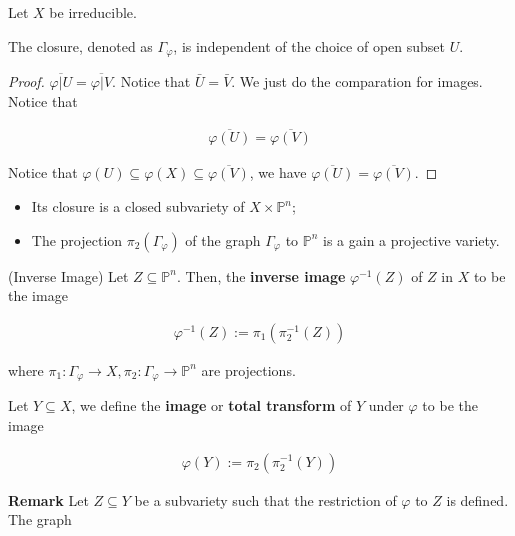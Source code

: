 \documentclass[Total.tex]{subfiles}
\begin{document}
		\begin{proposition}
			Let $X$ be irreducible.
			
			The closure, denoted as $\Gamma_\varphi$, is independent of the choice of open subset $U$.
		\end{proposition}
		
		\begin{proof}
			$\overline{\varphi|U}=\overline{\varphi|V}$. Notice that $\bar{U}=\bar{V}$. We just do the comparation for images. Notice that
			
			\begin{gather*}
				\overline{\varphi(U)}=\overline{\varphi(V)}
			\end{gather*}
			
			Notice that $\varphi(U)\subseteq \varphi(X)\subseteq \overline{\varphi(V)}$, we have $\overline{\varphi(U)}=\overline{\varphi(V)}$.
		\end{proof}
		
		\begin{itemize}
			\item Its closure is a closed subvariety of $X\times \mathbb{P}^n$;
			
			\item The projection $\pi_2(\Gamma_\varphi)$ of the graph $\Gamma_\varphi$ to $\mathbb{P}^n$ is a gain a projective variety. 
		\end{itemize}
		
		\begin{Def}
			(Inverse Image) Let $Z\subseteq \mathbb{P}^n$. Then, the \textbf{inverse image} $\varphi^{-1}(Z)$ of $Z$ in $X$ to be the image
			
			\begin{gather*}
				\varphi^{-1}(Z):=\pi_1(\pi_2^{-1}(Z))
			\end{gather*}
			
			where $\pi_1:\Gamma_\varphi\rightarrow X,\pi_2:\Gamma_\varphi\rightarrow\mathbb{P}^n$ are projections.
			
			Let $Y\subseteq X$, we define the \textbf{image} or \textbf{total transform} of $Y$ under $\varphi$ to be the image
			
			\begin{gather*}
				\varphi(Y):=\pi_2(\pi_2^{-1}(Y))
			\end{gather*}
		\end{Def}
		
		\textbf{Remark} Let $Z\subseteq Y$ be a subvariety such that the restriction of $\varphi$ to $Z$ is defined. The graph
		
\end{document}
